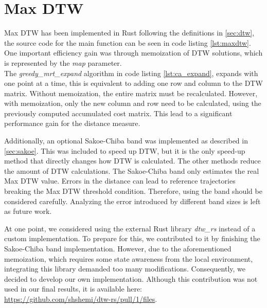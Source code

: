 \section{Max DTW}
\label{sec:dtw_impl}
Max DTW has been implemented in Rust following the definitions in \ref{sec:dtw}, the source code for the main function can be seen in code listing \ref{lst:maxdtw}. One important efficiency gain was through memoization of DTW solutions, which is represented by the \textit{map} parameter. \\ The \textit{greedy\_mrt\_expand} algorithm in code listing \ref{lst:ca_expand}, expands with one point at a time, this is equivalent to adding one row and column to the DTW matrix. Without memoization, the entire matrix must be recalculated. However, with memoization, only the new column and row need to be calculated, using the previously computed accumulated cost matrix. This lead to a significant performance gain for the distance measure.

Additionally, an optional Sakoe-Chiba band was implemented as described in \ref{sec:sakoe}. This was included to speed up DTW, but it is the only speed-up method that directly changes how DTW is calculated. The other methods reduce the amount of DTW calculations. The Sakoe-Chiba band only estimates the real Max DTW value. Errors in the distance can lead to reference trajectories breaking the Max DTW threshold condition. Therefore, using the band should be considered carefully. Analyzing the error introduced by different band sizes is left as future work.



At one point, we considered using the external Rust library \textit{dtw\_rs} instead of a custom implementation. To prepare for this, we contributed to it by finishing the Sakoe-Chiba band implementation. However, due to the aforementioned memoization, which requires some state awareness from the local environment, integrating this library demanded too many modifications. Consequently, we decided to develop our own implementation. Although this contribution was not used in our final results, it is available here: \\ \href{https://github.com/shshemi/dtw-rs/pull/1/files}{https://github.com/shshemi/dtw-rs/pull/1/files}.

